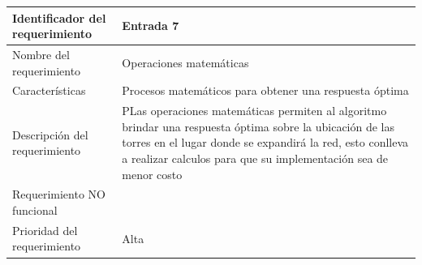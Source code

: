 \documentclass[]{article}
\begin{document}
\begin{longtable}[]{@{}ll@{}}
\toprule
\begin{minipage}[b]{0.39\columnwidth}\raggedright\strut
Identificador del requerimiento\strut
\end{minipage} & \begin{minipage}[b]{0.50\columnwidth}\raggedright\strut
Entrada 7\strut
\end{minipage}\tabularnewline
\midrule
\endhead
\begin{minipage}[t]{0.39\columnwidth}\raggedright\strut
Nombre del requerimiento\strut
\end{minipage} & \begin{minipage}[t]{0.50\columnwidth}\raggedright\strut
Operaciones matemáticas\strut
\end{minipage}\tabularnewline
\begin{minipage}[t]{0.39\columnwidth}\raggedright\strut
Características\strut
\end{minipage} & \begin{minipage}[t]{0.50\columnwidth}\raggedright\strut
Procesos matemáticos para obtener una respuesta óptima\strut
\end{minipage}\tabularnewline
\begin{minipage}[t]{0.39\columnwidth}\raggedright\strut
Descripción del requerimiento\strut
\end{minipage} & \begin{minipage}[t]{0.50\columnwidth}\raggedright\strut
PLas operaciones matemáticas permiten al algoritmo brindar una respuesta
óptima sobre la ubicación de las torres en el lugar donde se expandirá
la red, esto conlleva a realizar calculos para que su implementación sea
de menor costo\strut
\end{minipage}\tabularnewline
\begin{minipage}[t]{0.39\columnwidth}\raggedright\strut
Requerimiento NO funcional\strut
\end{minipage} & \begin{minipage}[t]{0.50\columnwidth}\raggedright\strut
\strut
\end{minipage}\tabularnewline
\begin{minipage}[t]{0.39\columnwidth}\raggedright\strut
Prioridad del requerimiento\strut
\end{minipage} & \begin{minipage}[t]{0.50\columnwidth}\raggedright\strut
Alta\strut
\end{minipage}\tabularnewline
\bottomrule
\end{longtable}
\end{document}
